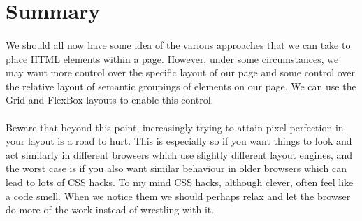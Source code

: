 \section{Summary}
\paragraph{} We should all now have some idea of the various approaches that we can take to place HTML elements within a page. However, under some circumstances, we may want more control over the specific layout of our page and some control over the relative layout of semantic groupings of elements on our page. We can use the Grid and FlexBox layouts to enable this control.

\paragraph{} Beware that beyond this point, increasingly trying to attain pixel perfection in your layout is a road to hurt. This is especially so if you want things to look and act similarly in different browsers which use slightly different layout engines, and the worst case is if you also want similar behaviour in older browsers which can lead to lots of CSS hacks. To my mind CSS hacks, although clever, often feel like a code smell. When we notice them we should perhaps relax and let the browser do more of the work instead of wrestling with it.

